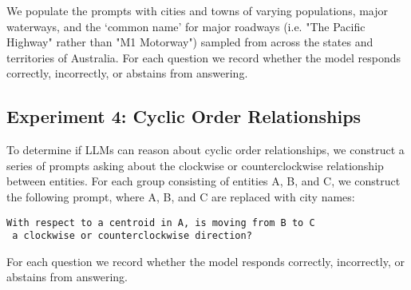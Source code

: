 \noindent We populate the prompts with cities and towns of varying populations, major waterways, and the `common name' for major roadways (i.e. "The Pacific Highway" rather than "M1 Motorway") sampled from across the states and territories of Australia.
For each question we record whether the model responds correctly, incorrectly, or abstains from answering.


\subsection{Experiment 4: Cyclic Order Relationships}
To determine if LLMs can reason about cyclic order relationships, we construct a series of prompts asking about the clockwise or counterclockwise relationship between entities.
For each group consisting of entities A, B, and C, we construct the following prompt, where A, B, and C are replaced with city names: 

\begin{lstlisting}[title=Prompt 12: Cyclic Order Relation Prompt]
 With respect to a centroid in A, is moving from B to C 
 a clockwise or counterclockwise direction?
\end{lstlisting}

\noindent 
For each question we record whether the model responds correctly, incorrectly, or abstains from answering.
